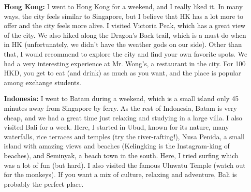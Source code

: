 \textbf{Hong Kong:} I went to Hong Kong for a weekend, and I really liked it. In many ways, the city feels similar to Singapore, but I believe that HK has a lot more to offer and the city feels more alive. I visited Victoria Peak, which has a great view of the city. We also hiked along the Dragon's Back trail, which is a must-do when in HK (unfortunately, we didn't have the weather gods on our side). Other than that, I would recommend to explore the city and find your own favorite spots. We had a very interesting experience at Mr. Wong's, a restaurant in the city. For 100 HKD, you get to eat (and drink) as much as you want, and the place is popular among exchange students.

\textbf{Indonesia:} I went to Batam during a weekend, which is a small island only 45 minutes away from Singapore by ferry. As the rest of Indonesia, Batam is very cheap, and we had a great time just relaxing and studying in a large villa. I also visited Bali for a week. Here, I started in Ubud, known for its nature, many waterfalls, rice terraces and temples (try the river-rafting!), Nusa Penida, a small island with amazing views and beaches (Kelingking is the Instagram-king of beaches), and Seminyak, a beach town in the south. Here, I tried surfing which was a lot of fun (but hard). I also visited the famous Uluwatu Temple (watch out for the monkeys). If you want a mix of culture, relaxing and adventure, Bali is probably the perfect place.

